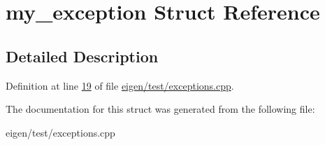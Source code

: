 \hypertarget{structmy__exception}{}\section{my\+\_\+exception Struct Reference}
\label{structmy__exception}


\subsection{Detailed Description}


Definition at line \hyperlink{eigen_2test_2exceptions_8cpp_source_l00019}{19} of file \hyperlink{eigen_2test_2exceptions_8cpp_source}{eigen/test/exceptions.\+cpp}.



The documentation for this struct was generated from the following file\+:\begin{DoxyCompactItemize}
\item 
eigen/test/exceptions.\+cpp\end{DoxyCompactItemize}
